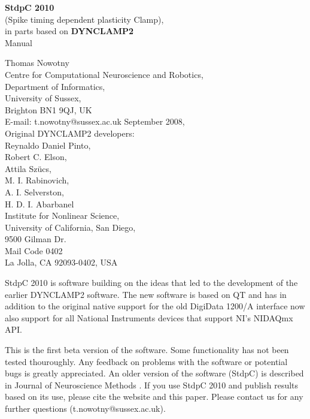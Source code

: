 \documentclass{article}
\begin{document}
\begin{titlepage}
  \begin{center}
  {{\bf \Large 
    StdpC 2010 }\\[0.3cm]
    \large (Spike timing dependent plasticity Clamp)}, \\[1cm]
  {\large 
    in parts based on {\bf DYNCLAMP2} \cite{Pinto2001} 
  } \\[2cm]
  {\sc \Large Manual }
  \end{center}
\vspace*{5cm}

\noindent
{\large Thomas Nowotny} \\[0.5cm]
Centre for Computational Neuroscience and Robotics, \\
Department of Informatics, \\
University of Sussex, \\
Brighton BN1 9QJ, UK \\
E-mail: t.nowotny@sussex.ac.uk
September 2008, \\[1cm]
Original DYNCLAMP2 developers: \\[0.2cm]
Reynaldo Daniel Pinto, \\
Robert C. Elson, \\
Attila Sz\"ucs, \\
M. I. Rabinovich, \\
A. I. Selverston,  \\
H. D. I. Abarbanel \\[0.5cm]
Institute for Nonlinear Science, \\
University of California, San Diego, \\
9500 Gilman Dr. \\ Mail Code 0402 \\
La Jolla, CA 92093-0402, USA \\

\end{titlepage}

StdpC 2010 is software building on the ideas that led
to the development of the earlier DYNCLAMP2
software. The new software is based on QT and has in addition to the
original native support for the old DigiData 1200/A interface now also
support for all National Instruments devices that support NI's NIDAQmx
API.
 
This is the first beta version of the software. Some functionality has
not been tested thouroughly. Any feedback on problems with the
software or potential bugs is greatly appreciated.  An older version
of the software (StdpC) is described in Journal of Neuroscience
Methods \cite{Nowotny2006}. If you use StdpC 2010 and publish results
based on its use, please cite the website and this paper. Please
contact us for any further questions (t.nowotny@sussex.ac.uk).
\end{document}

